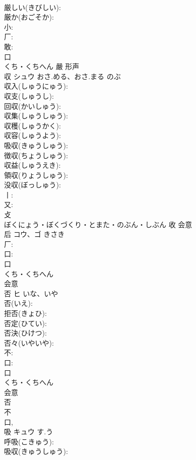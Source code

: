 \documentclass[8pt]{extreport}
\begin{document}
\begin{CJK}{UTF8}{min}
\\	厳しい(きびしい): 
\\	厳か(おごそか): 
\\	小: 
\\	厂: 
\\	敢: 
\\	口	
\\	くち・くちへん	嚴	形声 
\\	収	シュウ	おさ.める、おさ.まる	のぶ	
\\	収入(しゅうにゅう): 
\\	収支(しゅうし): 
\\	回収(かいしゅう): 
\\	収集(しゅうしゅう): 
\\	収穫(しゅうかく): 
\\	収容(しゅうよう): 
\\	吸収(きゅうしゅう): 
\\	徴収(ちょうしゅう): 
\\	収益(しゅうえき): 
\\	領収(りょうしゅう): 
\\	没収(ぼっしゅう): 
\\	丨: 
\\	又: 
\\	攴	
\\	ぼくにょう・ぼくづくり・とまた・のぶん・しぶん	收	会意 
\\	后	コウ、ゴ	きさき		
\\	厂: 
\\	口: 
\\	口	
\\	くち・くちへん	
\\	会意 
\\	否	ヒ	いな、いや		
\\	否(いえ): 
\\	拒否(きょひ): 
\\	否定(ひてい): 
\\	否決(ひけつ): 
\\	否々(いやいや): 
\\	不: 
\\	口: 
\\	口	
\\	くち・くちへん	
\\	会意 
\\	否 
\\	不 
\\	口, 
\\	吸	キュウ	す.う		
\\	呼吸(こきゅう): 
\\	吸収(きゅうしゅう): 

\end{CJK}
\end{document}

